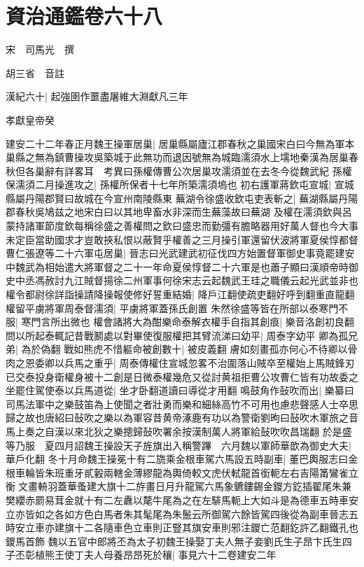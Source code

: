 \chapter{資治通鑑卷六十八}
宋　司馬光　撰

胡三省　音註

漢紀六十|{
	起強圉作噩盡屠維大淵獻凡三年}


孝獻皇帝癸

建安二十二年春正月魏王操軍居巢|{
	居巢縣屬廬江郡春秋之巢國宋白曰今無為軍本巢縣之無為鎮曹操攻吳築城于此無功而退因號無為城臨濡須水上壖地秦漢為居巢春秋但各巢辭有詳畧耳　考異曰孫權傳曹公次居巢攻濡須並在去冬今從魏武紀}
孫權保濡須二月操進攻之|{
	孫權所保者十七年所築濡須塢也}
初右護軍蔣欽屯宣城|{
	宣城縣屬丹陽郡賢曰故城在今宣州南陵縣東}
蕪湖令徐盛收欽屯吏表斬之|{
	蕪湖縣屬丹陽郡春秋吳鳩兹之地宋白曰以其地卑畜水非深而生蕪藻故曰蕪湖}
及權在濡須欽與呂蒙持諸軍節度欽每稱徐盛之善權問之欽曰盛忠而勤彊有膽略器用好萬人督也今大事未定臣當助國求才豈敢挾私恨以蔽賢乎權善之三月操引軍還留伏波將軍夏侯惇都督曹仁張遼等二十六軍屯居巢|{
	晉志曰光武建武初征伐四方始置督軍御史事竟罷建安中魏武為相始遣大將軍督之二十一年命夏侯惇督二十六軍是也蕭子顯曰漢順帝時御史中丞馮赦討九江賊督揚徐二州軍事何徐宋志云起魏武王珪之職儀云起光武並非也}
權令都尉徐詳詣操請降操報使修好誓重結婚|{
	降戶江翻使疏吏翻好呼到翻重直龍翻}
權留平虜將軍周泰督濡須|{
	平虜將軍蓋孫氏創置}
朱然徐盛等皆在所部以泰寒門不服|{
	寒門言所出微也}
權會諸將大為酣樂命泰解衣權手自指其創痕|{
	樂音洛創初良翻}
問以所起泰輒記昔戰鬭處以對畢使復服權把其臂流涕曰幼平|{
	周泰字幼平}
卿為孤兄弟|{
	為於偽翻}
戰如熊虎不惜軀命被創數十|{
	被皮義翻}
膚如刻畫孤亦何心不待卿以骨肉之恩委卿以兵馬之重乎|{
	周泰傳權住宣城忽畧不治圍落山賊卒至權始上馬賊鋒刃已交泰投身衛權身被十二創是日微泰權幾危又從討黄祖拒曹公攻曹仁皆有功故委之}
坐罷住駕使泰以兵馬道從|{
	坐才卧翻道讀曰導從才用翻}
鳴鼓角作鼔吹而出|{
	樂纂曰司馬法軍中之樂鼓笛為上使聞之者壯勇而樂和細絲高竹不可用也慮悲聲感人士卒思歸之故也唐紹曰鼔吹之樂以為軍容昔黄帝涿鹿有功以為警衛劉昫曰鼔吹木軍旅之音馬上奏之自漢以來北狄之樂摠歸鼔吹署余按漢制萬人將軍給鼔吹吹昌瑞翻}
於是盛等乃服　夏四月詔魏王操設天子旌旗出入稱警蹕　六月魏以軍師華歆為御史大夫|{
	華戶化翻}
冬十月命魏王操冕十有二旒乘金根車駕六馬設五時副車|{
	董巴輿服志曰金根車輪皆朱班重牙貳轂兩轄金薄繆龍為輿倚較文虎伏軾龍首銜軛左右吉陽筩鸞雀立衡文畫輈羽蓋華蚤建大旗十二斿畫日月升龍駕六馬象鑣鏤錫金鑁方釳插翟尾朱兼樊纓赤罽易茸金就十有二左纛以氂牛尾為之在左騑馬軛上大如斗是為德車五時車安立亦皆如之各如方色白馬者朱其髦尾為朱鬛云所御駕六餘皆駕四後從為副車晉志五時安立車亦建旗十二各隨車色立車則正豎其旗安車則邪注鑁亡范翻釳許乙翻鐵孔也鑁馬首飾}
魏以五官中郎將丕為太子初魏王操娶丁夫人無子妾劉氏生子昂卞氏生四子丕彰植熊王使丁夫人母養昂昂死於穰|{
	事見六十二卷建安二年}
